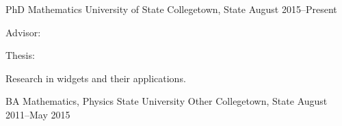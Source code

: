 

\begin{cventries}

  \cventry
    {PhD Mathematics} %
    {University of State} %
    {Collegetown, State} %
    {August 2015--Present} %
    {
      \begin{cvitems} %
        \item {Advisor: }
        \item {Thesis: }
        \item {Research in widgets and their applications.}
      \end{cvitems}
    }

  \cventry
    {BA Mathematics, Physics}
    {State University}
    {Other Collegetown, State}
    {August 2011--May 2015}
    {}

\end{cventries}
